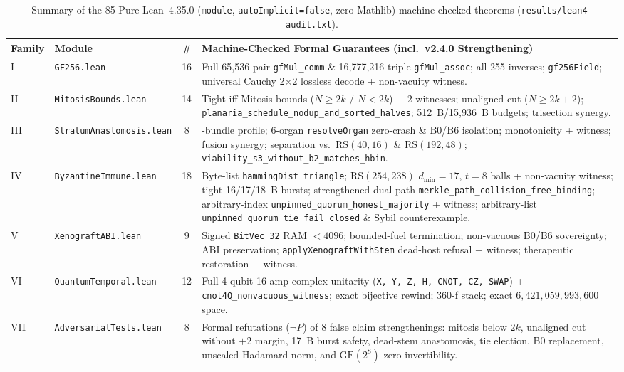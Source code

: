 \documentclass[11pt,letterpaper]{article}
\theoremstyle{remark}
\begin{document}
\begin{table}[ht]
\centering
\caption{Summary of the 85 Pure Lean~4.35.0 (\texttt{module}, \texttt{autoImplicit=false}, zero Mathlib) machine-checked theorems (\texttt{results/lean4-audit.txt}).}
\label{tab:lean}
\footnotesize
\setlength{\tabcolsep}{4pt}
\begin{tabular}{@{}llc>{\raggedright\arraybackslash}p{8.7cm}@{}}
\toprule
\textbf{Family} & \textbf{Module} & \textbf{\#} & \textbf{Machine-Checked Formal Guarantees (incl.\ v2.4.0 Strengthening)} \\
\midrule
I & \texttt{GF256.lean} & 16 & Full 65,536-pair \texttt{gfMul\_\allowbreak comm} \& 16,777,216-triple \texttt{gfMul\_\allowbreak assoc}; all 255 inverses; \texttt{gf256Field}; universal Cauchy 2$\times$2 lossless decode + non-vacuity witness. \\
II & \texttt{MitosisBounds.lean} & 14 & Tight iff Mitosis bounds ($N\ge 2k$ / $N<2k$) + 2 witnesses; unaligned cut ($N\ge 2k+2$); \texttt{planaria\_\allowbreak schedule\_\allowbreak nodup\_\allowbreak and\_\allowbreak sorted\_\allowbreak halves}; 512~B/15,936~B budgets; trisection synergy. \\
III & \texttt{StratumAnastomosis.lean} & 8 & 7-bundle profile; 6-organ \texttt{resolveOrgan} zero-crash \& B0/B6 isolation; monotonicity + witness; fusion synergy; separation vs.\ $\mathrm{RS}(40,16)$ \& $\mathrm{RS}(192,48)$; \texttt{viability\_\allowbreak s3\_\allowbreak without\_\allowbreak b2\_\allowbreak matches\_\allowbreak hbin}. \\
IV & \texttt{ByzantineImmune.lean} & 18 & Byte-list \texttt{hammingDist\_\allowbreak triangle}; $\mathrm{RS}(254,238)$ $d_{\min}=17$, $t=8$ balls + non-vacuity witness; tight 16/17/18~B bursts; strengthened dual-path \texttt{merkle\_\allowbreak path\_\allowbreak collision\_\allowbreak free\_\allowbreak binding}; arbitrary-index \texttt{unpinned\_\allowbreak quorum\_\allowbreak honest\_\allowbreak majority} + witness; arbitrary-list \texttt{unpinned\_\allowbreak quorum\_\allowbreak tie\_\allowbreak fail\_\allowbreak closed} \& Sybil counterexample. \\
V & \texttt{XenograftABI.lean} & 9 & Signed \texttt{BitVec 32} RAM $<4096$; bounded-fuel termination; non-vacuous B0/B6 sovereignty; ABI preservation; \texttt{applyXenograftWithStem} dead-host refusal + witness; therapeutic restoration + witness. \\
VI & \texttt{QuantumTemporal.lean} & 12 & Full 4-qubit 16-amp complex unitarity (\texttt{X, Y, Z, H, CNOT, CZ, SWAP}) + \texttt{cnot4Q\_\allowbreak nonvacuous\_\allowbreak witness}; exact bijective rewind; 360-f stack; exact $6{,}421{,}059{,}993{,}600$ space. \\
VII & \texttt{AdversarialTests.lean} & 8 & Formal refutations ($\neg P$) of 8 false claim strengthenings: mitosis below $2k$, unaligned cut without $+2$ margin, 17~B burst safety, dead-stem anastomosis, tie election, B0 replacement, unscaled Hadamard norm, and $\mathrm{GF}(2^8)$ zero invertibility. \\
\bottomrule
\end{tabular}
\end{table}
\end{document}

